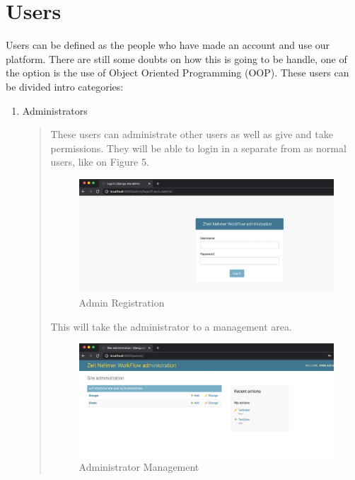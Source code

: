 \documentclass{article}[draft]
\begin{document}
\section{Users}
  Users can be defined as the people who have made an account and use our platform. There are still some doubts on how this is going to be handle, one of the option is the use of Object Oriented Programming (OOP). These users can be divided intro categories:
  \begin{enumerate}
    \item Administrators
    \begin{quote}
        These users can administrate other users as well as give and take permissions. They will be able to login in a separate from as normal users, like on Figure 5.
        \begin{figure}[h!]
            \centering
            \includegraphics[scale=0.75]{Images/adminLogin.png}
            \caption{Admin Registration}
            \label{fig:figure 5}
        \end{figure}

        \vspace{160}

        This will take the administrator to a management area.

        \begin{figure}[h!]
            \centering
            \includegraphics[scale=0.75]{Images/adminManage.png}
            \caption{Administrator Management}
            \label{fig:figure 6}
        \end{figure}




\end{quote}
\end{enumerate}
\end{document}
